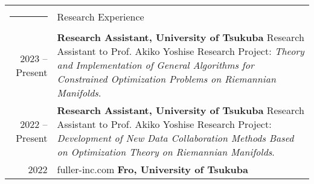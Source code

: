 \documentclass[letterpaper,10pt]{article}
\newcommand{\headingfont}{\LARGE }
\newenvironment{SectionTable}[1]{
	\renewcommand*{\arraystretch}{1.0}
	\setlength{\tabcolsep}{10pt}
	\begin{longtable}{Rp{5.2in}} 
		\rule{2.5cm}{4pt} 
		& #1 \\ %
	}
	{
	\end{longtable}\vspace{-.3cm}
}
\begin{document}
\begin{SectionTable}{\headingfont Research Experience}
	2023 -- Present & 
	\textbf{Research Assistant, University of Tsukuba} \newline
	Research Assistant to Prof. Akiko Yoshise \newline
	Research Project: \textit{Theory and Implementation of General Algorithms for Constrained Optimization Problems on Riemannian Manifolds}. \\
	
	2022 -- Present & 
	\textbf{Research Assistant, University of Tsukuba} \newline
	Research Assistant to Prof. Akiko Yoshise \newline
	Research Project: \textit{Development of New Data Collaboration Methods Based on Optimization Theory on Riemannian Manifolds}. \\
	
	2022 & fuller-inc.com
	\textbf{Fro, University of Tsukuba}
\end{SectionTable}

\end{document}

